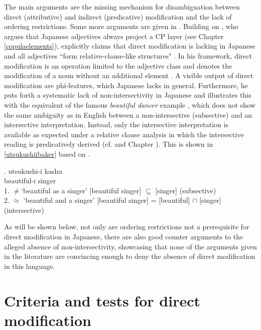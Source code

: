 \documentclass [output=book,colorlinks,citecolor=brown]{langscibook}
\begin{document}
The main arguments are the missing mechanism for disambiguation between direct (attributive) and indirect (predicative) modification and the lack of ordering restrictions. Some more arguments are given in \citet{baker:2003:verbal}. Building on \citet{nishiyama:1999:adj}, who argues that Japanese adjectives always project a CP layer (see Chapter \ref{copulaelements}), \citet{baker:2003:verbal} explicitly claims that direct modification is lacking in Japanese and all adjectives ``form relative-clause-like structures" \citep[19]{baker:2003:verbal}. In his framework, direct modification is an operation limited to the adjective class and denotes the modification of a noun without an additional element \citep[191]{baker:2003:cat}. A visible output of direct modification are phi-features, which Japanese lacks in general. Furthermore, he puts forth a systematic lack of non-intersectivity in Japanese and illustrates this with the equivalent of the famous \textit{beautiful dancer} example \citep{larson:1998:events}, which does not show the same ambiguity as in English between a non-intersective (subsective) and an intersective interpretation. Instead, only the intersective interpretation is available as expected under a relative clause analysis in which the intersective reading is predicatively derived (cf. \citealt{cinque:2010:adj} and Chapter ). This is shown in \ref{utsukushiibaker} based on \citet[3]{baker:2003:verbal}. %

\exg. utsukushi-i kashu\\
beautiful-\textsc{i} singer \\
1. $\neq$`beautiful as a singer’ [beautiful singer] $\subseteq$ [singer] (subsective)\\
2. $\approx$ `beautiful and a singer’ [beautiful singer] = [beautiful] $\cap$ [singer] (intersective) \label{utsukushiibaker}

As will be shown below, not only are ordering restrictions not a prerequisite for direct modification in Japanese, there are also good counter arguments to the alleged absence of non-intersectivity, showcasing that none of the arguments given in the literature are convincing enough to deny the absence of direct modification in this language.

\section{Criteria and tests for direct modification} \label{testsdirect}
\end{document}
